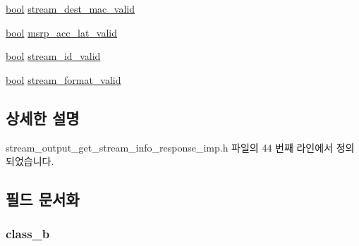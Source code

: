 \begin{DoxyCompactItemize}
\hyperlink{avb__gptp_8h_af6a258d8f3ee5206d682d799316314b1}{bool} \hyperlink{structavdecc__lib_1_1stream__output__get__stream__info__response__imp_1_1stream__output__stream__info__flags_aa59e3e425c98b1896df389388badf552}{stream\+\_\+dest\+\_\+mac\+\_\+valid}
\item 
\hyperlink{avb__gptp_8h_af6a258d8f3ee5206d682d799316314b1}{bool} \hyperlink{structavdecc__lib_1_1stream__output__get__stream__info__response__imp_1_1stream__output__stream__info__flags_a76e57c40000dae00652fce08a9209c08}{msrp\+\_\+acc\+\_\+lat\+\_\+valid}
\item 
\hyperlink{avb__gptp_8h_af6a258d8f3ee5206d682d799316314b1}{bool} \hyperlink{structavdecc__lib_1_1stream__output__get__stream__info__response__imp_1_1stream__output__stream__info__flags_a55a28e49c305c48aa5f8034e4cd5cd4c}{stream\+\_\+id\+\_\+valid}
\item 
\hyperlink{avb__gptp_8h_af6a258d8f3ee5206d682d799316314b1}{bool} \hyperlink{structavdecc__lib_1_1stream__output__get__stream__info__response__imp_1_1stream__output__stream__info__flags_ad914b819b99c60f0c27472ee4292bd3e}{stream\+\_\+format\+\_\+valid}
\end{DoxyCompactItemize}


\subsection{상세한 설명}


stream\+\_\+output\+\_\+get\+\_\+stream\+\_\+info\+\_\+response\+\_\+imp.\+h 파일의 44 번째 라인에서 정의되었습니다.



\subsection{필드 문서화}
\subsubsection[{\texorpdfstring{class\+\_\+b}{class_b}}]{ class\+\_\+b}\hypertarget{structavdecc__lib_1_1stream__output__get__stream__info__response__imp_1_1stream__output__stream__info__flags_abc5d506df26fed870be7682ddbcaf9af}{}\label{structavdecc__lib_1_1stream__output__get__stream__info__response__imp_1_1stream__output__stream__info__flags_abc5d506df26fed870be7682ddbcaf9af}


